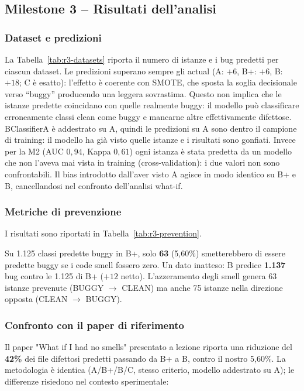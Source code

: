 \subsection{Milestone 3 -- Risultati dell'analisi}

\subsubsection{Dataset e predizioni}

La Tabella~\ref{tab:r3-datasets} riporta il numero di istanze e i bug predetti per ciascun
dataset. Le predizioni superano sempre gli actual (A: $+6$, B+: $+6$, B: $+18$; C è esatto):
l'effetto è coerente con SMOTE, che sposta la soglia decisionale verso ``buggy'' producendo
una leggera sovrastima. Questo non implica che le istanze predette coincidano
con quelle realmente buggy: il modello può classificare erroneamente classi clean come buggy
e mancarne altre effettivamente difettose. BClassifierA è addestrato su A, quindi le predizioni su A sono dentro il campione
di training: il modello ha già visto quelle istanze e i risultati sono gonfiati.
Invece per la M2 (AUC $0{,}94$, Kappa $0{,}61$) ogni
istanza è stata predetta da un modello che non l'aveva mai vista in training (cross-validation):
i due valori non sono confrontabili. Il bias introdotto dall'aver visto A agisce in modo
identico su B+ e B, cancellandosi nel confronto dell'analisi what-if.

\subsubsection{Metriche di prevenzione}

I risultati sono riportati in Tabella~\ref{tab:r3-prevention}.

Su 1.125 classi predette buggy in B+, solo \textbf{63} (5,60\%) smetterebbero di essere
predette buggy se i code smell fossero zero. Un dato inatteso: B predice \textbf{1.137}
bug contro le 1.125 di B+ ($+12$ netto). L'azzeramento degli smell genera 63 istanze
prevenute (BUGGY $\to$ CLEAN) ma anche 75 istanze nella direzione opposta (CLEAN $\to$
BUGGY).

\subsubsection{Confronto con il paper di riferimento}

Il paper "What if I had no smells" presentato a lezione riporta
una riduzione del \textbf{42\%} dei file difettosi predetti passando da B+ a B, contro
il nostro 5,60\%. La metodologia è identica (A/B+/B/C, stesso criterio, modello addestrato
su A); le differenze risiedono nel contesto sperimentale:


